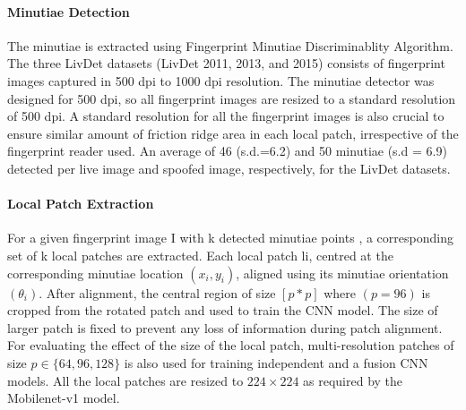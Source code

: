 \paragraph{Minutiae Detection}
The minutiae is extracted using Fingerprint Minutiae Discriminablity Algorithm. The three LivDet datasets (LivDet 2011, 2013, and 2015) consists of fingerprint images captured in 500 dpi to 1000 dpi resolution. The minutiae detector was designed for 500 dpi, so all fingerprint images are resized to a standard resolution of 500 dpi. A standard resolution for all the fingerprint images is also crucial to ensure similar amount of friction ridge area in each local patch, irrespective of the fingerprint reader used. An average of 46 (s.d.=6.2) and 50 minutiae (s.d = 6.9) detected per live image and spoofed image, respectively, for the LivDet datasets.
\paragraph{Local Patch Extraction}
For a given fingerprint image I with k detected minutiae points , a corresponding set of k local patches are extracted. Each local patch li, centred at the corresponding minutiae location $ (x_{i},y_{i})$,  aligned using its minutiae orientation $( \theta_{i})$.  After alignment, the central region of size $[ p\ast p]$ where $ ( p = 96 )$ is cropped from the rotated patch and used to train the CNN model. The size of larger patch is fixed to  prevent any loss of information during patch alignment. For evaluating the effect of the size of the local patch, multi-resolution patches of size $ p \in \lbrace 64,96,128 \rbrace $ is also used for training independent and a fusion CNN models. All the local patches are resized to $ 224 \times 224 $ as required by the Mobilenet-v1 model.
